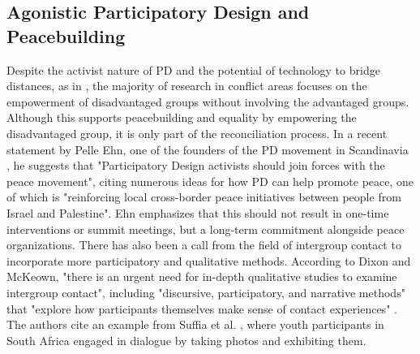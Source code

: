 \documentclass[dissertation,math,vertlayout,pdfa,colorlinks,nologo]{aaltoseries}
\begin{document}
\subsection{Agonistic Participatory Design and Peacebuilding}
Despite the activist nature of PD and the potential of technology to bridge distances, as in \cite{clarkeDecolonisingParticipatoryDesign2022}, the majority of research in conflict areas focuses on the empowerment of disadvantaged groups without involving the advantaged groups. Although this supports peacebuilding and equality by empowering the disadvantaged group, it is only part of the reconciliation process. In a recent statement by Pelle Ehn, one of the founders of the PD movement in Scandinavia \cite[p.293]{bodkerAfterthoughtsEmergentFuture2025}, he suggests that "Participatory Design activists should join forces with the peace movement", citing numerous ideas for how PD can help promote peace, one of which is "reinforcing local cross-border peace initiatives between people from Israel and Palestine". Ehn emphasizes that this should not result in one-time interventions or summit meetings, but a long-term commitment alongside peace organizations. There has also been a call from the field of intergroup contact to incorporate more participatory and qualitative methods. According to Dixon and McKeown, "there is an urgent need for in-depth qualitative studies to examine intergroup contact", including "discursive, participatory, and narrative methods" that "explore how participants themselves make sense of contact experiences" \cite{dixonNegativeContactCollective2021}. The authors cite an example from Suffia et al. \cite{sufflaPhotovoiceCommunityEngaged2012}, where youth participants in South Africa engaged in dialogue by taking photos and exhibiting them.
\end{document}
